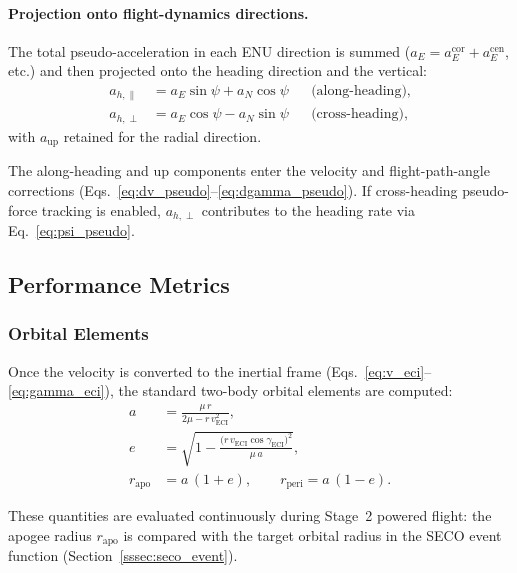 \paragraph{Projection onto flight-dynamics directions.}
The total pseudo-acceleration in each ENU direction is summed ($a_E = a_E^{\text{cor}} + a_E^{\text{cen}}$, etc.) and then projected onto the heading direction and the vertical:
\begin{align}
  a_{h,\parallel} &= a_E\sin\psi + a_N\cos\psi
    & &\text{(along-heading)}, \label{eq:a_par} \\
  a_{h,\perp}     &= a_E\cos\psi - a_N\sin\psi
    & &\text{(cross-heading)}, \label{eq:a_perp}
\end{align}
with $a_{\text{up}}$ retained for the radial direction.

The along-heading and up components enter the velocity and flight-path-angle
corrections (Eqs.~\ref{eq:dv_pseudo}--\ref{eq:dgamma_pseudo}).  If cross-heading
pseudo-force tracking is enabled, $a_{h,\perp}$ contributes to the heading
rate via Eq.~\eqref{eq:psi_pseudo}.

\subsection{Performance Metrics}
\label{ssec:performance}

\subsubsection{Orbital Elements}
\label{sssec:orbital_elements}

Once the velocity is converted to the inertial frame
(Eqs.~\ref{eq:v_eci}--\ref{eq:gamma_eci}), the standard two-body orbital
elements are computed:
\begin{align}
  a &= \frac{\mu\,r}{2\mu - r\,v_{\text{ECI}}^2},
    \label{eq:sma}\\[3pt]
  e &= \sqrt{1 - \frac{\bigl(r\,v_{\text{ECI}}\cos\gamma_{\text{ECI}}\bigr)^2}
       {\mu\,a}},
    \label{eq:ecc}\\[3pt]
  r_{\text{apo}} &= a\,(1+e), \qquad
  r_{\text{peri}} = a\,(1-e).
  \label{eq:apsides}
\end{align}

These quantities are evaluated continuously during Stage~2 powered flight: the
apogee radius $r_{\text{apo}}$ is compared with the target orbital radius in
the SECO event function (Section~\ref{sssec:seco_event}).

